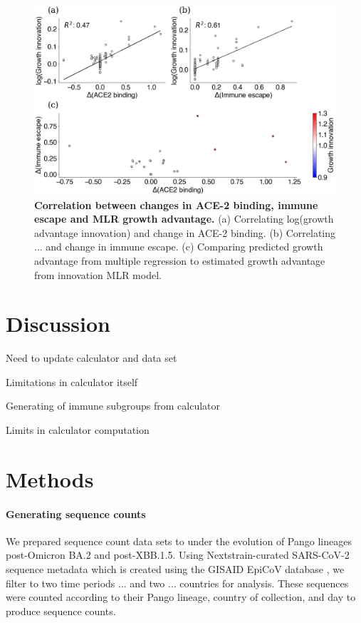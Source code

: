 \documentclass[12pt,oneside,letterpaper]{article}
\begin{document}
\begin{figure}[h]
	\centering
	\includegraphics[width=1.0\textwidth]{figures/binding-escape-score-growth-advantage-innovations}
	\caption{\textbf{Correlation between changes in ACE-2 binding, immune escape and MLR growth advantage.}
        (a) Correlating log(growth advantage innovation) and change in ACE-2 binding. 
        (b) Correlating ... and change in immune escape.
        (c) Comparing predicted growth advantage from multiple regression to estimated growth advantage from innovation MLR model.
	}
	\label{binding-escape-score-growth-advantage-innovations-3}
\end{figure}


\section*{Discussion}

Need to update calculator and data set

Limitations in calculator itself

Generating of immune subgroups from calculator

Limits in calculator computation


\section*{Methods}

\paragraph{Generating sequence counts}%

We prepared sequence count data sets to under the evolution of Pango lineages post-Omicron BA.2 and post-XBB.1.5. 
Using Nextstrain-curated SARS-CoV-2 sequence metadata \cite{hadfield2018nextstrain} which is created using the GISAID EpiCoV database \cite{khare2021gisaid}, we filter to two time periods ... and two ... countries for analysis. 
These sequences were counted according to their Pango lineage, country of collection, and day to produce sequence counts.
\end{document}

